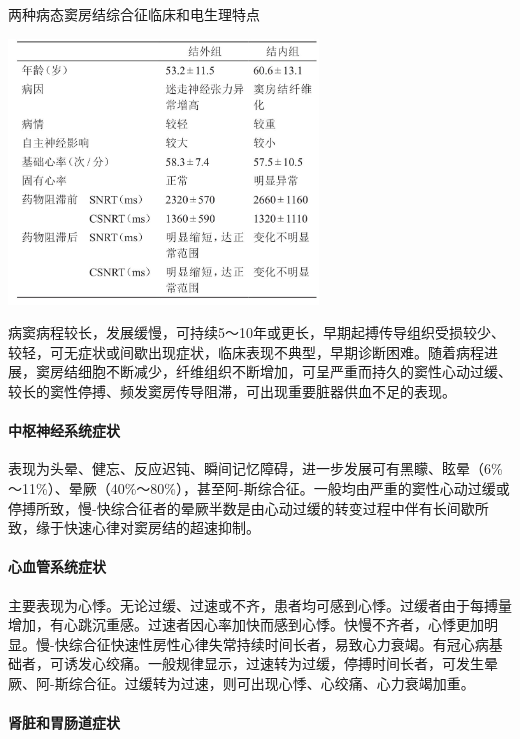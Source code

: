 \begin{table}[htbp]
\centering
\caption{两种病态窦房结综合征临床和电生理特点}
\label{tab102-24}
\includegraphics[width=3.23958in,height=2.77083in]{./images/Image00465.jpg}
\end{table}

病窦病程较长，发展缓慢，可持续5～10年或更长，早期起搏传导组织受损较少、较轻，可无症状或间歇出现症状，临床表现不典型，早期诊断困难。随着病程进展，窦房结细胞不断减少，纤维组织不断增加，可呈严重而持久的窦性心动过缓、较长的窦性停搏、频发窦房传导阻滞，可出现重要脏器供血不足的表现。

\paragraph{中枢神经系统症状}

表现为头晕、健忘、反应迟钝、瞬间记忆障碍，进一步发展可有黑矇、眩晕（6\%～11\%）、晕厥（40\%～80\%），甚至阿-斯综合征。一般均由严重的窦性心动过缓或停搏所致，慢-快综合征者的晕厥半数是由心动过缓的转变过程中伴有长间歇所致，缘于快速心律对窦房结的超速抑制。

\paragraph{心血管系统症状}

主要表现为心悸。无论过缓、过速或不齐，患者均可感到心悸。过缓者由于每搏量增加，有心跳沉重感。过速者因心率加快而感到心悸。快慢不齐者，心悸更加明显。慢-快综合征快速性房性心律失常持续时间长者，易致心力衰竭。有冠心病基础者，可诱发心绞痛。一般规律显示，过速转为过缓，停搏时间长者，可发生晕厥、阿-斯综合征。过缓转为过速，则可出现心悸、心绞痛、心力衰竭加重。

\paragraph{肾脏和胃肠道症状}

